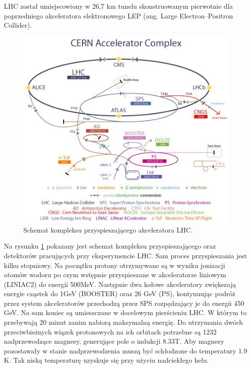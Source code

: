 LHC został umiejscowiony w 26,7 km tunelu skonstruowanym pierwotnie dla poprzedniego akceleratora elektronowego LEP (ang. Large Electron–Positron Collider). 
\begin{figure}[h]
  \centering
  \includegraphics[scale=1]{rozdzial2/AccComple.jpeg}
  \caption{Schemat kompleksu przyspieszającego akceleratora LHC. \cite{public}}
  \label{fig:AccComplex}
\end{figure}

Na rysunku \ref{fig:AccComplex} pokazany jest schemat kompleksu przyspieszającego oraz detektorów pracujących przy eksperymencie LHC. Sam proces przyspieszania jest kilku stopniowy\cite{Haefeli}.
Na początku protony otrzymywane są w wyniku jonizacji atomów wodoru po czym wstępnie przyspieszane w akceleratorze liniowym (LINIAC2) do energii 500MeV. Następnie dwa kołowe akceleratory zwiększają energie cząstek do 1GeV (BOOSTER) oraz 26 GeV (PS), kontynuując podróż przez system akceleratorów  przechodzą przez SPS rozpędzający je do energii 450 GeV. Na sam koniec są umieszczane w docelowym pierścieniu LHC. W którym to przebywają 20 minut zanim nabiorą maksymalną energię. Do utrzymania dwóch przeciwbieżnych wiązek protonowych na ich orbitach potrzebne są 1232 nadprzewodzące magnesy, generujące pole o indukcji 8.33T. Aby magnesy pozostawały w stanie nadprzewodzenia muszą być schłodzone do temperatury 1.9 K. Tak niską temperaturę uzyskuje się przy użyciu nadciekłego helu. 

